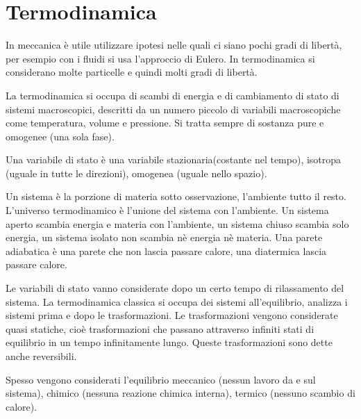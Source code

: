 \chapter{Termodinamica}

In meccanica è utile utilizzare ipotesi nelle quali ci siano pochi gradi di libertà, per esempio con i fluidi si usa l'approccio di Eulero. In termodinamica si considerano molte particelle e quindi molti gradi di libertà.

La termodinamica si occupa di scambi di energia e di cambiamento di stato di sistemi macroscopici, descritti da un numero piccolo di variabili macroscopiche come temperatura, volume e pressione. Si tratta sempre di sostanza pure e omogenee (una sola fase).

Una variabile di stato è una variabile stazionaria(costante nel tempo), isotropa (uguale in tutte le direzioni), omogenea (uguale nello spazio).

Un sistema è la porzione di materia sotto osservazione, l'ambiente  tutto il resto. L'universo termodinamico è l'unione del sistema con l'ambiente. Un sistema aperto  scambia energia e materia con l'ambiente, un sistema chiuso  scambia solo energia, un sistema isolato non scambia nè energia nè materia. Una parete adiabatica è una parete che non lascia passare calore, una diatermica lascia passare calore.

Le variabili di stato vanno considerate dopo un certo tempo di rilassamento del sistema. La termodinamica classica si occupa dei sistemi all'equilibrio, analizza i sistemi prima e dopo le trasformazioni. Le trasformazioni vengono considerate quasi statiche, cioè trasformazioni che passano attraverso infiniti stati di equilibrio in un tempo infinitamente lungo. Queste trasformazioni sono dette anche reversibili.

Spesso vengono considerati l'equilibrio meccanico (nessun lavoro da e sul sistema), chimico (nessuna reazione chimica interna), termico (nessuno scambio di calore).

